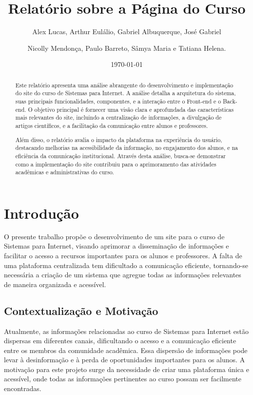 \documentclass[a4paper,12pt]{report}
\title{Relatório sobre a Página do Curso}
\author{
    Alex Lucas, Arthur Eulálio, Gabriel Albuquerque, José Gabriel \and
    Nicolly Mendonça, Paulo Barreto, Sâmya Maria e Tatiana Helena.
}
\date{\today}
\begin{document}
\maketitle

\begin{abstract}
Este relatório apresenta uma análise abrangente do desenvolvimento e implementação do site do curso de Sistemas para Internet. A análise detalha a arquitetura do sistema, suas principais funcionalidades, componentes, e a interação entre o Front-end e o Back-end. O objetivo principal é fornecer uma visão clara e aprofundada das características mais relevantes do site, incluindo a centralização de informações, a divulgação de artigos científicos, e a facilitação da comunicação entre alunos e professores.  
 
Além disso, o relatório avalia o impacto da plataforma na experiência do usuário, destacando melhorias na acessibilidade da informação, no engajamento dos alunos, e na eficiência da comunicação institucional. Através desta análise, busca-se demonstrar como a implementação do site contribuiu para o aprimoramento das atividades acadêmicas e administrativas do curso. 
\end{abstract}

\tableofcontents
\newpage

\chapter{Introdução}
O presente trabalho propõe o desenvolvimento de um site para o curso de Sistemas para Internet, visando aprimorar a disseminação de informações e facilitar o acesso a recursos importantes para os alunos e professores. A falta de uma plataforma centralizada tem dificultado a comunicação eficiente, tornando-se necessária a criação de um sistema que agregue todas as informações relevantes de maneira organizada e acessível.

\section{Contextualização e Motivação}
Atualmente, as informações relacionadas ao curso de Sistemas para Internet estão dispersas em diferentes canais, dificultando o acesso e a comunicação eficiente entre os membros da comunidade acadêmica. Essa dispersão de informações pode levar à desinformação e à perda de oportunidades importantes para os alunos. A motivação para este projeto surge da necessidade de criar uma plataforma única e acessível, onde todas as informações pertinentes ao curso possam ser facilmente encontradas.
\end{document}
